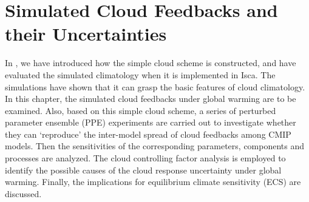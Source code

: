 \chapter{Simulated Cloud Feedbacks and their Uncertainties}

\label{ch:cld_fbk}

In , we have introduced how the simple cloud scheme is constructed, and have evaluated the simulated climatology when it is implemented in Isca. The simulations have shown that it can grasp the basic features of cloud climatology. In this chapter, the simulated cloud feedbacks under global warming are to be examined. Also, based on this simple cloud scheme, a series of perturbed parameter ensemble (PPE) experiments are carried out to investigate whether they can `reproduce' the inter-model spread of cloud feedbacks among CMIP models. Then the sensitivities of the corresponding parameters, components and processes are analyzed. The cloud controlling factor analysis is employed to identify the possible causes of the cloud response uncertainty under global warming. Finally, the implications for equilibrium climate sensitivity (ECS) are discussed.

